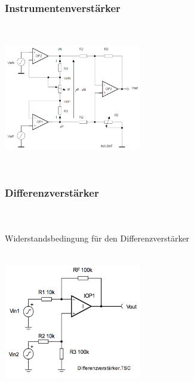 		\subsubsection{Instrumentenverstärker }
		\begin{minipage}[b]{12cm}
		\hspace*{10mm}\\
		\end{minipage}
		\begin{minipage}{6cm}
          	\includegraphics[width=6cm]{./bilder/Instrumentationsverstaerker.png} 
        \end{minipage}\\

		\subsubsection{Differenzverstärker }
			\begin{minipage}[b]{12cm}
            	\hspace*{10mm}\\
            	\\ Widerstandsbedingung für den Differenzverstärker\\ \\
            	\hspace*{10mm}
            	\hspace{15mm}
            	\hfill
            \end{minipage}
			\begin{minipage}{6cm}
            	\includegraphics[width=6cm]{./bilder/differenzver.png}
            \end{minipage}\\


